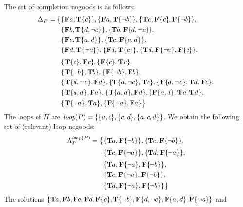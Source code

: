 \begin{Loesung}%
\noindent\textnormal{%
The set of completion nogoods is as follows:
\begin{align*}
  \Delta_P = \big\{ &    
  \{\mathbf{F}a,\mathbf{T}\{c\}\},\{\mathbf{F}a,\mathbf{T}\{{\neg{b}}\}\},
  \{\mathbf{T}a,\mathbf{F}\{c\},\mathbf{F}\{{\neg{b}}\}\},
  {} \\ &
  \{\mathbf{F}b,\mathbf{T}\{d,{\neg{c}}\}\},\{\mathbf{T}b,\mathbf{F}\{d,{\neg{c}}\}\},
  {} \\ &
  \{\mathbf{F}c,\mathbf{T}\{a,d\}\},\{\mathbf{T}c,\mathbf{F}\{a,d\}\},
  {} \\ &
  \{\mathbf{F}d,\mathbf{T}\{{\neg{a}}\}\},\{\mathbf{F}d,\mathbf{T}\{c\}\},
  \{\mathbf{T}d,\mathbf{F}\{{\neg{a}}\},\mathbf{F}\{c\}\},
  {} \\[1mm] &
  \{\mathbf{T}\{c\},\mathbf{F}c\},
  \{\mathbf{F}\{c\},\mathbf{T}c\},
  {} \\ &
  \{\mathbf{T}\{{\neg{b}}\},\mathbf{T}b\},
  \{\mathbf{F}\{{\neg{b}}\},\mathbf{F}b\},
  {} \\ &
  \{\mathbf{T}\{d,{\neg{c}}\},\mathbf{F}d\},
  \{\mathbf{T}\{d,{\neg{c}}\},\mathbf{T}c\},
  \{\mathbf{F}\{d,{\neg{c}}\},\mathbf{T}d,\mathbf{F}c\},
  {} \\ &
  \{\mathbf{T}\{a,d\},\mathbf{F}a\},
  \{\mathbf{T}\{a,d\},\mathbf{F}d\},
  \{\mathbf{F}\{a,d\},\mathbf{T}a,\mathbf{T}d\},
  {} \\ &
  \{\mathbf{T}\{{\neg{a}}\},\mathbf{T}a\},
  \{\mathbf{F}\{{\neg{a}}\},\mathbf{F}a\}
  \big\}
\end{align*}
The loops of $\Pi$ are $\mathit{loop}(P)=\{\{a,c\},\{c,d\},\{a,c,d\}\}$.
We obtain the following set of (relevant) loop nogoods:
\begin{align*}
  \Lambda_P^{\mathit{loop}(P)} = \big\{ &    
  \{\mathbf{T}a,\mathbf{F}\{{\neg{b}}\}\},
  \{\mathbf{T}c,\mathbf{F}\{{\neg{b}}\}\},
  {} \\[1mm] &  
  \{\mathbf{T}c,\mathbf{F}\{{\neg{a}}\}\},
  \{\mathbf{T}d,\mathbf{F}\{{\neg{a}}\}\},
  {} \\[1mm] &  
  \{\mathbf{T}a,\mathbf{F}\{{\neg{a}}\},\mathbf{F}\{{\neg{b}}\}\},
  {} \\ &
  \{\mathbf{T}c,\mathbf{F}\{{\neg{a}}\},\mathbf{F}\{{\neg{b}}\}\},
  {} \\ &
  \{\mathbf{T}d,\mathbf{F}\{{\neg{a}}\},\mathbf{F}\{{\neg{b}}\}\}
  \big\}
\end{align*}
The solutions
$\{\mathbf{T}a,\mathbf{F}b,\mathbf{F}c,\mathbf{F}d,
   \mathbf{F}\{c\},\mathbf{T}\{{\neg{b}}\},\mathbf{F}\{d,{\neg{c}}\},\mathbf{F}\{a,d\},\mathbf{F}\{{\neg{a}}\}\}$
and\linebreak[4]%
}
\end{Loesung}

